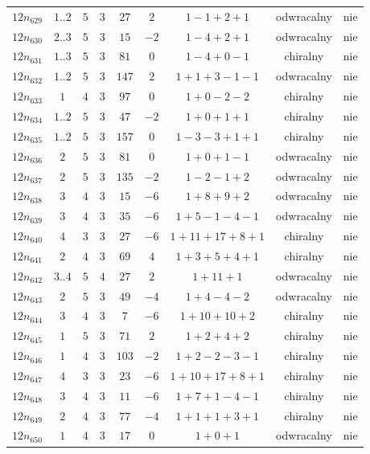 \begin{longtable}{ccccccccc}
$12n_{629}$ & $1..2$ & $5$ & $3$ & $27$ & $2$ & $1-1+2+1$ & odwracalny & nie \\
$12n_{630}$ & $2..3$ & $5$ & $3$ & $15$ & $-2$ & $1-4+2+1$ & odwracalny & nie \\
$12n_{631}$ & $1..3$ & $5$ & $3$ & $81$ & $0$ & $1-4+0-1$ & chiralny & nie \\
$12n_{632}$ & $1..2$ & $5$ & $3$ & $147$ & $2$ & $1+1+3-1-1$ & odwracalny & nie \\
$12n_{633}$ & $1$ & $4$ & $3$ & $97$ & $0$ & $1+0-2-2$ & chiralny & nie \\
$12n_{634}$ & $1..2$ & $5$ & $3$ & $47$ & $-2$ & $1+0+1+1$ & chiralny & nie \\
$12n_{635}$ & $1..2$ & $5$ & $3$ & $157$ & $0$ & $1-3-3+1+1$ & chiralny & nie \\
$12n_{636}$ & $2$ & $5$ & $3$ & $81$ & $0$ & $1+0+1-1$ & odwracalny & nie \\
$12n_{637}$ & $2$ & $5$ & $3$ & $135$ & $-2$ & $1-2-1+2$ & odwracalny & nie \\
$12n_{638}$ & $3$ & $4$ & $3$ & $15$ & $-6$ & $1+8+9+2$ & odwracalny & nie \\
$12n_{639}$ & $3$ & $4$ & $3$ & $35$ & $-6$ & $1+5-1-4-1$ & odwracalny & nie \\
$12n_{640}$ & $4$ & $3$ & $3$ & $27$ & $-6$ & $1+11+17+8+1$ & chiralny & nie \\
$12n_{641}$ & $2$ & $4$ & $3$ & $69$ & $4$ & $1+3+5+4+1$ & chiralny & nie \\
$12n_{642}$ & $3..4$ & $5$ & $4$ & $27$ & $2$ & $1+11+1$ & odwracalny & nie \\
$12n_{643}$ & $2$ & $5$ & $3$ & $49$ & $-4$ & $1+4-4-2$ & odwracalny & nie \\
$12n_{644}$ & $3$ & $4$ & $3$ & $7$ & $-6$ & $1+10+10+2$ & chiralny & nie \\
$12n_{645}$ & $1$ & $5$ & $3$ & $71$ & $2$ & $1+2+4+2$ & chiralny & nie \\
$12n_{646}$ & $1$ & $4$ & $3$ & $103$ & $-2$ & $1+2-2-3-1$ & chiralny & nie \\
$12n_{647}$ & $4$ & $3$ & $3$ & $23$ & $-6$ & $1+10+17+8+1$ & chiralny & nie \\
$12n_{648}$ & $3$ & $4$ & $3$ & $11$ & $-6$ & $1+7+1-4-1$ & chiralny & nie \\
$12n_{649}$ & $2$ & $4$ & $3$ & $77$ & $-4$ & $1+1+1+3+1$ & chiralny & nie \\
$12n_{650}$ & $1$ & $4$ & $3$ & $17$ & $0$ & $1+0+1$ & odwracalny & nie \\

\end{longtable}
